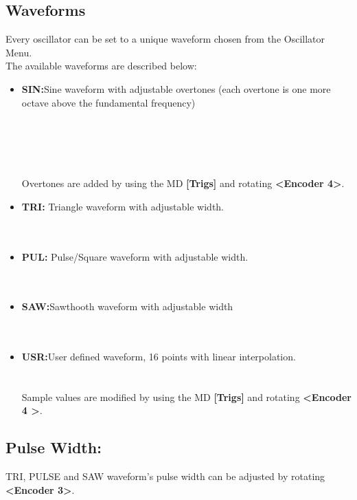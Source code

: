 \subsection{Waveforms}
Every oscillator can be set to a unique waveform chosen from the Oscillator Menu.
\\
The available waveforms are described below:

\begin{itemize}
\item{\textbf{SIN:}}Sine waveform with adjustable overtones (each overtone is one more octave above the fundamental frequency)\\
\\\\
\\\\
\\Overtones are added by using the MD \textbf{[Trigs]} and rotating \textbf{<Encoder 4>}.
\item{\textbf{TRI:}} Triangle waveform with adjustable width.\\
\\\\
\item{\textbf{PUL:}} Pulse/Square waveform with adjustable width.\\
\\\\
\item{\textbf{SAW:}}Sawthooth waveform with adjustable width\\
\\\\
\item{\textbf{USR:}}User defined waveform, 16 points with linear interpolation.\\
\\\\
Sample values are modified by using the MD \textbf{[Trigs]} and rotating \textbf{<Encoder 4 >}.
\end{itemize}
\subsection{Pulse Width:}
TRI, PULSE and SAW waveform's pulse width can be adjusted by rotating \textbf{<Encoder 3>}.\\
\\
\newpage

